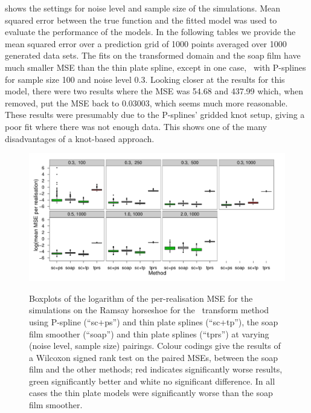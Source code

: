  shows the settings for noise level and sample size of the simulations. Mean squared error between the true function and the fitted model was used to evaluate the performance of the models. In the following tables we provide the mean squared error over a prediction grid of 1000 points averaged over 1000 generated data sets. The fits on the transformed domain and the soap film have much smaller MSE than the thin plate spline, except in one case, \sch\ with P-splines for sample size 100 and noise level 0.3. Looking closer at the results for this model, there were two results where the MSE was 54.68 and 437.99 which, when removed, put the MSE back to 0.03003, which seems much more reasonable. These results were presumably due to the P-splines' gridded knot setup, giving a poor fit where there was not enough data. This shows one of the many disadvantages of a knot-based approach.

\begin{figure}
\centering
\includegraphics{sc/tablecode/ramsay-boxplot.pdf} \\
\caption{Boxplots of the logarithm of the per-realisation MSE for the simulations on the Ramsay horseshoe for the \sch\ transform method using P-spline (``sc+ps'') and thin plate splines (``sc+tp''), the soap film smoother (``soap'') and thin plate splines (``tprs'') at varying (noise level, sample size) pairings. Colour codings give the results of a Wilcoxon signed rank test on the paired MSEs, between the soap film and the other methods; red indicates significantly worse results, green significantly better and white no significant difference. In all cases the thin plate models were significantly worse than the soap film smoother.}
\label{sc-ram-boxplot}
\end{figure}


